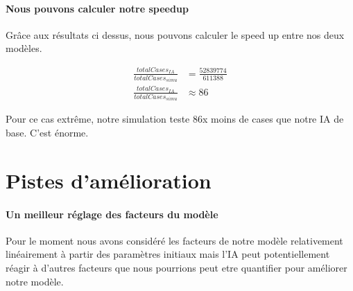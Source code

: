 		\paragraph{Nous pouvons calculer notre speedup}
		Grâce aux résultats ci dessus, nous pouvons calculer le speed up entre nos deux modèles.
		
		\begin{align}
			\frac{totalCases_{IA}}{totalCases_{simu}} &= \frac{52839774}{611388}\\
			\frac{totalCases_{IA}}{totalCases_{simu}} &\approx 86 
		\end{align}
		
		\begin{result}
			Pour ce cas extrême, notre simulation teste 86x moins de cases que notre IA de base. C'est énorme.
		\end{result}
	
	\section{Pistes d'amélioration}
	
		\paragraph{Un meilleur réglage des facteurs du modèle}
		Pour le moment nous avons considéré les facteurs de notre modèle relativement linéairement à partir des paramètres initiaux mais l'IA peut potentiellement réagir à d'autres facteurs que nous pourrions peut etre quantifier pour améliorer notre modèle.
	
